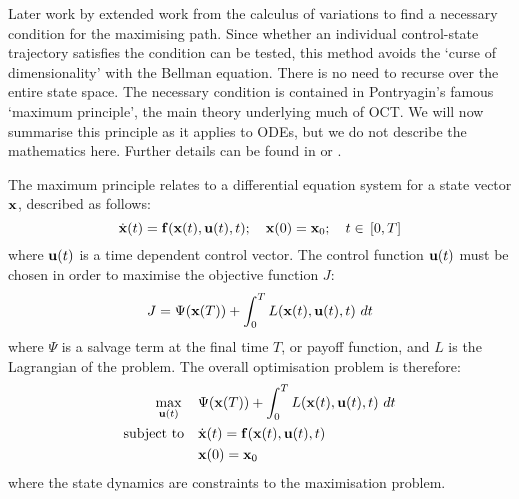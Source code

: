 Later work by \citet{pontryagin_mathematical_1962} extended work from the calculus of variations to find a necessary condition for the maximising path. Since whether an individual control-state trajectory satisfies the condition can be tested, this method avoids the `curse of dimensionality' with the Bellman equation. There is no need to recurse over the entire state space. The necessary condition is contained in Pontryagin's famous `maximum principle', the main theory underlying much of OCT\@. We will now summarise this principle as it applies to ODEs, but we do not describe the mathematics here. Further details can be found in \citet{lenhart_optimal_2007} or \citet{hocking_optimal_1991}.

The maximum principle relates to a differential equation system for a state vector $\mathbf{\bm{x}}$, described as follows:
\begin{equation}\label{eqn:ch2:state_system}
    \dot{\mathbf{\bm{x}}}(t) = \mathbf{\bm{f}}(\mathbf{\bm{x}}(t), \mathbf{\bm{u}}(t), t);\quad{}\mathbf{\bm{x}}(0)=\mathbf{\bm{x}}_0;\quad{}t\in{}\left[0, T\right]
\end{equation}
where $\mathbf{\bm{u}}(t)$ is a time dependent control vector. The control function $\mathbf{\bm{u}}(t)$ must be chosen in order to maximise the objective function $J$:
\begin{equation}\label{eqn:ch2:objective}
    J = \Psi{}(\mathbf{\bm{x}}(T)) + \int_0^TL(\mathbf{\bm{x}}(t), \mathbf{\bm{u}}(t), t)\,\mathop{dt}
\end{equation}
where $\Psi$ is a salvage term at the final time $T$, or payoff function, and $L$ is the Lagrangian of the problem. The overall optimisation problem is therefore:
\begin{subequations}\label{eqn:ch2:opt_problem}
    \begin{align}
        \max_{\vect{u}(t)} \quad{} &\null \Psi{}(\vect{x}(T)) + \int_0^TL(\vect{x}(t), \vect{u}(t), t)\,\mathop{dt} \label{eqn:ch2:opt_problem_a}\\
        \text{subject to} \quad{} &\null \dot{\vect{x}}(t) = \vect{f}(\vect{x}(t), \vect{u}(t), t) \label{eqn:ch2:opt_problem_b}\\
        &\null \vect{x}(0)=\vect{x}_0 \label{eqn:ch2:opt_problem_c}
    \end{align}
\end{subequations}
where the state dynamics are constraints to the maximisation problem.

